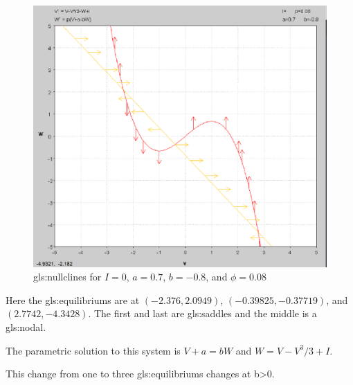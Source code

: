 \documentclass[../Orator]{subfiles}
\begin{document}
\begin{figure}[ht]
    \centering
    \includegraphics[width=400pt]{Pictures/Alex/Nullclines - negative.PNG}
    \caption{\glspl{gls:nullcline} for \(I=0\), \(a=0.7\), \(b=-0.8\), and \(\phi=0.08\)}
    \label{fig:nullclines-negative}
\end{figure}

Here the \glspl{gls:equilibrium} are at \((-2.376, 2.0949)\), \((-0.39825, -0.37719)\), and \((2.7742, -4.3428)\). The first and last are \glspl{gls:saddle} and the middle is a \gls{gls:nodal}.

The parametric solution to this system is \(V+a=bW\) and \(W=V-V^3/3+I\).

This change from one to three \glspl{gls:equilibrium} changes at b>0. 

\end{document}
